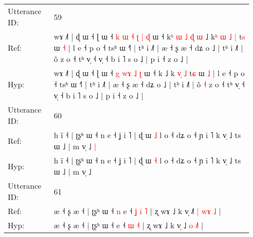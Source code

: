 \documentclass[10pt]{article}
\DeclareRobustCommand{\hl}[1]{{\textcolor{red}{#1}}}
\begin{document}
\begin{longtable}{ll}
 \\
\midrule
Utterance ID: & 59 \\
Ref: & wɤ ˩˥ | ɖ ɯ ˧ ɭ ɯ ˧\hl{ }\hl{k} \hl{ɯ} \hl{˧}\hl{ }\hl{ʈ} \hl{|} \hl{ɖ} ɯ ˧ k\hl{ʰ}\hl{ }\hl{ɯ}\hl{ }\hl{˩}\hl{ }\hl{ɖ}\hl{ }\hl{ɯ} ˩ k\hl{ʰ} \hl{ɯ}\hl{ }\hl{˩} \hl{|} t\hl{s} ɯ \hl{˧} | l e ˧ p o ˧ tsʰ ɯ ˧˥ | tʰ i ˩˥ | æ ˧ ʂ æ ˧ dʑ o ˩ | tʰ i ˩˥ | õ\hl{}\hl{} z o ˧ tʰ v̩ ˧ v̩ ˧ b i ˥ s o ˩ | p i ˧ z o ˩ |
 \\
Hyp: & wɤ ˩˥ | ɖ ɯ ˧ ɭ ɯ ˧\hl{}\hl{} \hl{g} \hl{}\hl{w}\hl{ɤ} \hl{˩} \hl{ʈ} ɯ ˧ k\hl{}\hl{}\hl{}\hl{}\hl{}\hl{}\hl{}\hl{}\hl{} ˩ k\hl{} \hl{}\hl{v}\hl{̩} \hl{˩} t\hl{ɕ} ɯ \hl{˩} | l e ˧ p o ˧ tsʰ ɯ ˧˥ | tʰ i ˩˥ | æ ˧ ʂ æ ˧ dʑ o ˩ | tʰ i ˩˥ | õ\hl{ }\hl{˧} z o ˧ tʰ v̩ ˧ v̩ ˧ b i ˥ s o ˩ | p i ˧ z o ˩ |
 \\
\midrule
Utterance ID: & 60 \\
Ref: & h ĩ ˧ | ʈʂʰ ɯ ˧ n e ˧ ʝ i ˥ | ɖ ɯ \hl{˩} l o ˧ dʑ o ˧ ɲ i ˥ k v̩ ˩ ts ɯ ˩ | m v̩ ˩\hl{ }\hl{|}
 \\
Hyp: & h ĩ ˧ | ʈʂʰ ɯ ˧ n e ˧ ʝ i ˥ | ɖ ɯ \hl{˧} l o ˧ dʑ o ˧ ɲ i ˥ k v̩ ˩ ts ɯ ˩ | m v̩ ˩\hl{}\hl{}
 \\
\midrule
Utterance ID: & 61 \\
Ref: & æ ˧ ʂ æ ˧ | ʈʂʰ ɯ ˧\hl{ }\hl{n} e ˧\hl{ }\hl{ʝ} \hl{i} \hl{˥} | ʐ wɤ ˩ k v̩ ˩\hl{˥} \hl{|} \hl{w}\hl{ɤ}\hl{ }\hl{˩} |
 \\
Hyp: & æ ˧ ʂ æ ˧ | ʈʂʰ ɯ ˧\hl{}\hl{} e ˧\hl{}\hl{} \hl{ɯ} \hl{˧} | ʐ wɤ ˩ k v̩ ˩\hl{} \hl{o} \hl{}\hl{}\hl{˩}\hl{˥} |
 \\
\midrule
\end{longtable}
\end{document}
